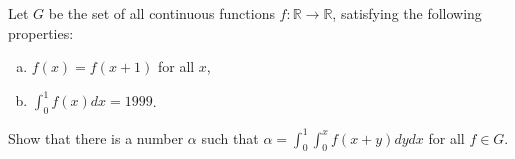 Let $G$ be the set of all continuous functions $f : \mathbb{R} \to \mathbb{R}$,
satisfying the following properties:

\begin{enumerate}[(a)]
\item $f(x) = f(x + 1)$ for all $x$,
\item $\displaystyle{\int_{0}^{1} f(x) dx = 1999}$.
\end{enumerate}
Show that there is a number $\alpha$ such that $\alpha =
\displaystyle{\int_{0}^{1} \int_{0}^{x} f(x + y) dy dx}$ for all $f \in G$.
